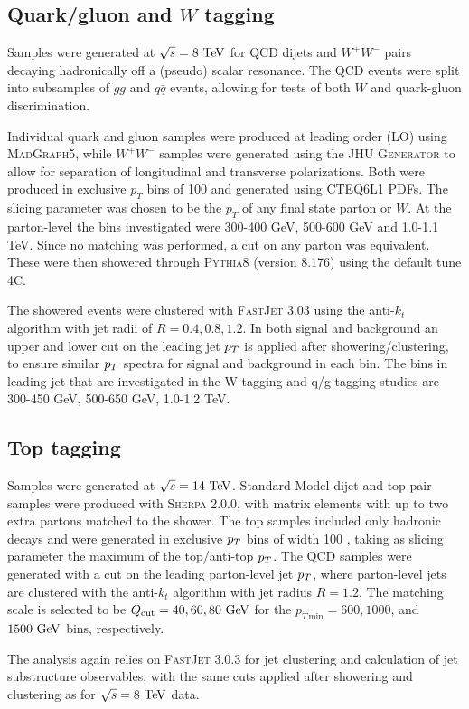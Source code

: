\subsection{Quark/gluon and $W$ tagging}

Samples were generated at $\sqrt{s} = 8\TeV$ for QCD dijets and $W^+W^-$
pairs decaying hadronically off a (pseudo) scalar resonance. The QCD events
were split into subsamples of $gg$ and $q\bar{q}$ events, allowing for tests
of both $W$ and quark-gluon discrimination. 

Individual quark and gluon samples were produced at leading order (LO)
using \textsc{MadGraph5}, while $W^+W^-$ samples were generated using
the \textsc{JHU Generator} to allow for separation of longitudinal and
transverse polarizations. Both were produced in exclusive $p_T$ bins
of 100 {\GeV} and generated using \textsc{CTEQ6L1} PDFs. The slicing parameter
was chosen to be the $p_T$ of any final state parton or $W$. At the
parton-level the \pt bins investigated were 300-400 GeV, 500-600 GeV
and 1.0-1.1 TeV. Since
no matching was performed, a cut on any parton was equivalent. These were
then showered through \textsc{Pythia8} (version 8.176) using the default tune 4C.

The showered events were clustered with \textsc{FastJet} 3.03 using
the anti-$k_t$ algorithm with jet radii of $R = 0.4, 0.8, 1.2$. In
both signal and background an upper and lower cut on
the leading jet $p_T$ is applied after showering/clustering, to ensure
similar $p_T$ spectra for signal and background in each bin. The bins
in leading jet \pt that are investigated in the W-tagging and
q/g tagging studies are 300-450 GeV, 500-650 GeV, 1.0-1.2 TeV.

\subsection{Top tagging}
Samples were generated at $\sqrt{s}=14\TeV$. Standard Model dijet and top pair
samples were produced with \textsc{Sherpa} 2.0.0, with matrix elements with up
to two extra partons matched to the shower. The top samples included only
hadronic decays and  were generated in exclusive $p_T$ bins of width 100 \GeV,
taking as slicing parameter the maximum of the top/anti-top $p_T$. The QCD
samples were generated with a cut on the leading parton-level jet $p_T$, where
parton-level jets are clustered with the anti-$k_t$ algorithm with jet radius
$R=1.2$. The matching scale is selected to be $Q_{\rm cut}=40, 60, 80 \GeV$ for
the $p_{T\,\text{min}}=600, 1000$, and $1500 \GeV$ bins, respectively.
 
The analysis again relies on \textsc{FastJet} 3.0.3 for jet clustering and
calculation of jet substructure observables, with the same cuts applied after
showering and clustering as for $\sqrt{s} = 8\TeV$ data.